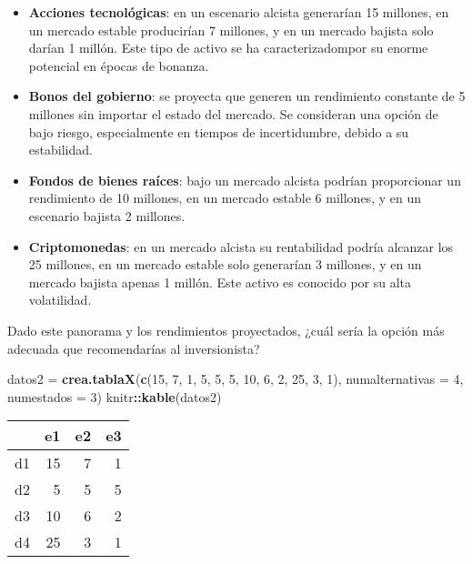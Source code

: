 \documentclass[
]{article}
\newenvironment{Shaded}{\begin{snugshade}}{\end{snugshade}}
\newcommand{\AttributeTok}[1]{\textcolor[rgb]{0.13,0.29,0.53}{#1}}
\newcommand{\DecValTok}[1]{\textcolor[rgb]{0.00,0.00,0.81}{#1}}
\newcommand{\FunctionTok}[1]{\textcolor[rgb]{0.13,0.29,0.53}{\textbf{#1}}}
\newcommand{\NormalTok}[1]{#1}
\newcommand{\OtherTok}[1]{\textcolor[rgb]{0.56,0.35,0.01}{#1}}
\newcommand{\SpecialCharTok}[1]{\textcolor[rgb]{0.81,0.36,0.00}{\textbf{#1}}}
\begin{document}
\begin{itemize}
\item
  \textbf{Acciones tecnológicas}: en un escenario alcista generarían 15
  millones, en un mercado estable producirían 7 millones, y en un
  mercado bajista solo darían 1 millón. Este tipo de activo se ha
  caracterizadompor su enorme potencial en épocas de bonanza.
\item
  \textbf{Bonos del gobierno}: se proyecta que generen un rendimiento
  constante de 5 millones sin importar el estado del mercado. Se
  consideran una opción de bajo riesgo, especialmente en tiempos de
  incertidumbre, debido a su estabilidad.
\item
  \textbf{Fondos de bienes raíces}: bajo un mercado alcista podrían
  proporcionar un rendimiento de 10 millones, en un mercado estable 6
  millones, y en un escenario bajista 2 millones.
\item
  \textbf{Criptomonedas}: en un mercado alcista su rentabilidad podría
  alcanzar los 25 millones, en un mercado estable solo generarían 3
  millones, y en un mercado bajista apenas 1 millón. Este activo es
  conocido por su alta volatilidad.
\end{itemize}

Dado este panorama y los rendimientos proyectados, ¿cuál sería la opción
más adecuada que recomendarías al inversionista?

\begin{Shaded}
\begin{Highlighting}[]
\NormalTok{datos2 }\OtherTok{=} \FunctionTok{crea.tablaX}\NormalTok{(}\FunctionTok{c}\NormalTok{(}\DecValTok{15}\NormalTok{, }\DecValTok{7}\NormalTok{, }\DecValTok{1}\NormalTok{,}
                       \DecValTok{5}\NormalTok{,  }\DecValTok{5}\NormalTok{, }\DecValTok{5}\NormalTok{,}
                       \DecValTok{10}\NormalTok{, }\DecValTok{6}\NormalTok{, }\DecValTok{2}\NormalTok{,}
                       \DecValTok{25}\NormalTok{, }\DecValTok{3}\NormalTok{, }\DecValTok{1}\NormalTok{), }\AttributeTok{numalternativas =} \DecValTok{4}\NormalTok{, }\AttributeTok{numestados =} \DecValTok{3}\NormalTok{)}
\NormalTok{knitr}\SpecialCharTok{::}\FunctionTok{kable}\NormalTok{(datos2)}
\end{Highlighting}
\end{Shaded}

\begin{longtable}[]{@{}lrrr@{}}
\toprule\noalign{}
& e1 & e2 & e3 \\
\midrule\noalign{}
\endhead
\bottomrule\noalign{}
\endlastfoot
d1 & 15 & 7 & 1 \\
d2 & 5 & 5 & 5 \\
d3 & 10 & 6 & 2 \\
d4 & 25 & 3 & 1 \\
\end{longtable}
\end{document}
